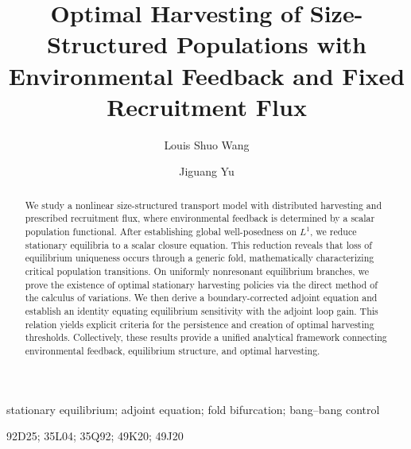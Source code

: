 \documentclass[a4paper,fleqn,longmktitle]{cas-sc}
\theoremstyle{plain}
\theoremstyle{definition}
\theoremstyle{remark}
\numberwithin{equation}{section}
\begin{document}


\title [mode = title]{Optimal Harvesting of Size-Structured Populations with Environmental Feedback and Fixed Recruitment Flux}

\author[1]{Louis Shuo Wang}
\cormark[1]  
\fnmark[1]  

            
\author[2]{Jiguang Yu}
\fnmark[1] 

            


\begin{abstract}
We study a nonlinear size-structured transport model with distributed harvesting and prescribed recruitment flux, where environmental feedback is determined by a scalar population functional. After establishing global well-posedness on $L^1$, we reduce stationary equilibria to a scalar closure equation. This reduction reveals that loss of equilibrium uniqueness occurs through a generic fold, mathematically characterizing critical population transitions. On uniformly nonresonant equilibrium branches, we prove the existence of optimal stationary harvesting policies via the direct method of the calculus of variations. We then derive a boundary-corrected adjoint equation and establish an identity equating equilibrium sensitivity with the adjoint loop gain. This relation yields explicit criteria for the persistence and creation of optimal harvesting thresholds. Collectively, these results provide a unified analytical framework connecting environmental feedback, equilibrium structure, and optimal harvesting.
\end{abstract}

\begin{keywords}
stationary equilibrium;
adjoint equation;
fold bifurcation;
bang--bang control

\MSC[2020] 92D25; 35L04; 35Q92; 49K20; 49J20
\end{keywords}
\end{document}
